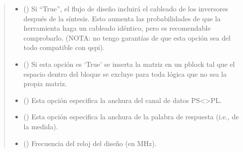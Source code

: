 \documentclass[letterpaper,10pt,english]{sphinxmanual}
\begin{document}
\begin{fulllineitems}
\begin{fulllineitems}
\begin{quote}
\begin{description}
\begin{itemize}
\item {} 
\sphinxAtStartPar
{} (\sphinxstyleliteralemphasis{\sphinxupquote{, }}) \textendash{} Si “True”, el flujo de diseño incluirá el cableado de los inversores después de la síntesis. Esto aumenta las probabilidades de que la herramienta haga un cableado idéntico, pero es recomendable comprobarlo. (NOTA: no tengo garantías de que esta opción sea del todo compatible con \sphinxhyphen{}qspi).

\item {} 
\sphinxAtStartPar
{} (\sphinxstyleliteralemphasis{\sphinxupquote{, }}) \textendash{} Si esta opción es ‘True’ se inserta la matriz en un pblock tal que el espacio dentro del bloque se excluye para toda lógica que no sea la propia matriz.

\item {} 
\sphinxAtStartPar
{} (\sphinxstyleliteralemphasis{\sphinxupquote{, }}) \textendash{} Esta opción especifica la anchura del canal de datos PS\textless{}\textendash{}\textgreater{}PL.

\item {} 
\sphinxAtStartPar
{} (\sphinxstyleliteralemphasis{\sphinxupquote{, }}) \textendash{} Esta opción especifica la anchura de la palabra de respuesta (i.e., de la medida).

\item {} 
\sphinxAtStartPar
{} (\sphinxstyleliteralemphasis{\sphinxupquote{, }}) \textendash{} Frecuencia del reloj del diseño (en MHz).

\end{itemize}

\end{description}\end{quote}

\end{fulllineitems}


\end{fulllineitems}
\end{document}
